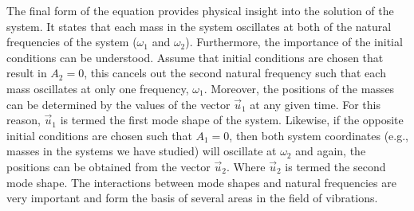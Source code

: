 \documentclass[12pt,letter]{article}
\begin{document}
	The final form of the equation provides physical insight into the solution of the system. It states that each mass in the system oscillates at both of the natural frequencies of the system ($\omega_1$ and $\omega_2$). Furthermore, the importance of the initial conditions can be understood. Assume that initial conditions are chosen that result in $A_2=0$, this cancels out the second natural frequency such that each mass oscillates at only one frequency,  $\omega_1$. Moreover, the positions of the masses can be determined by the values of the vector $\vec{u}_1$ at any given time. For this reason,  $\vec{u}_1$ is termed the first mode shape of the system. Likewise, if the opposite initial conditions are chosen such that  $A_1=0$, then both system coordinates (e.g., masses in the systems we have studied) will oscillate at $\omega_2$ and again, the positions can be obtained from the vector $\vec{u}_2$. Where $\vec{u}_2$ is termed the second mode shape. The interactions between mode shapes and natural frequencies are very important and form the basis of several areas in the field of vibrations.
	
\end{document}
